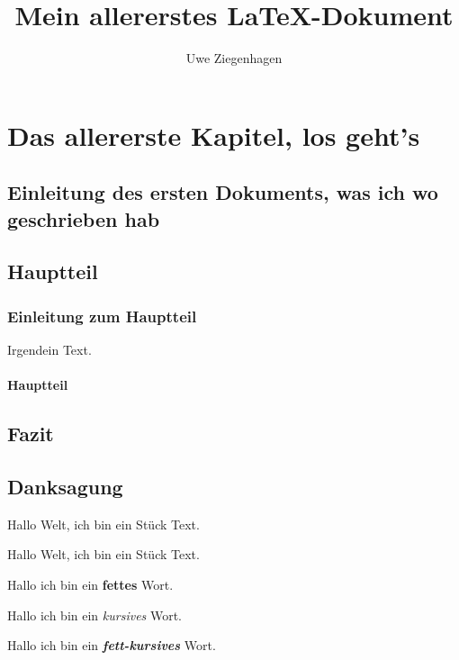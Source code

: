 \documentclass[15pt,ngerman]{scrreprt}
\author{Uwe Ziegenhagen}
\title{Mein allererstes \LaTeX-Dokument}
\begin{document}
\maketitle

\tableofcontents

\chapter{Das allererste Kapitel, los geht's}

\section{Einleitung des ersten Dokuments, was ich wo geschrieben hab}

\blindtext

\section{Hauptteil}

\subsection{Einleitung zum Hauptteil}

Irgendein Text.

\subsubsection{Hauptteil}


\blindtext[2]

\blindtext[2]


\section{Fazit}

\blindtext[100]


\section{Danksagung}

Hallo Welt, ich bin ein Stück Text.

Hallo Welt, ich bin ein Stück Text.

Hallo ich bin ein \textbf{fettes} Wort.

Hallo ich bin ein \textit{kursives} Wort.

Hallo ich bin ein \textbf{\textit{fett-kursives}} Wort.
\end{document}
